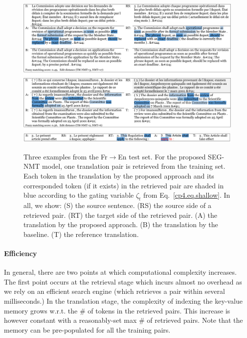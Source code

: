 \begin{figure}[htpb]
\centering
\includegraphics[width=\linewidth]{figs/seg/example-c2.pdf}
\centering
\includegraphics[width=\linewidth]{figs/seg/example-d2.pdf}
\centering
\includegraphics[width=\linewidth]{figs/seg/example-g3.pdf}
\caption{\label{cp4.fig.examples} 
Three examples from the Fr$\to$En test set. For the proposed SEG-NMT model, one translation pair is retrieved from the training set. Each token in the translation by the proposed approach and its corresponded token (if it exists) in the retrieved pair are shaded in blue according to the gating variable $\zeta_t$ from Eq.~\eqref{cp4.eq.shallow}. In all, we show: (S) the source sentence. (RS) the source side of a retrieved pair. (RT) the target side of the retrieved pair.
(A) the translation by the proposed approach. (B) the translation by the baseline. (T) the reference translation.
}
\end{figure}

\paragraph{Efficiency}
In general, there are two points at which computational complexity increases. The first point occurs at the retrieval stage which incurs almost no overhead as we rely on an efficient search engine (which retrieves a pair within several milliseconds.) In the translation stage, the complexity of indexing the key-value memory grows w.r.t. the \# of tokens in the retrieved pairs. This increase is however constant with a reasonably-set max \# of retrieved pairs. Note that the memory can be pre-populated for all the training pairs.

